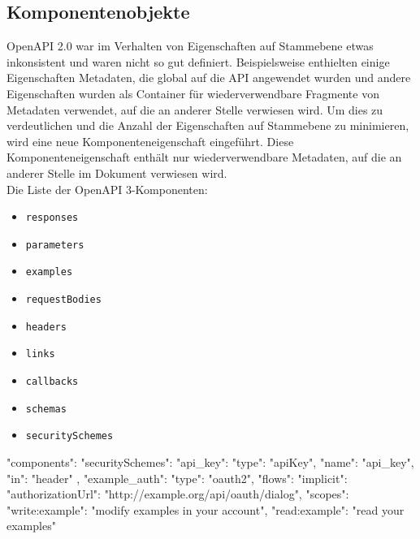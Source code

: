 \subsection{Komponentenobjekte}

OpenAPI 2.0 war im Verhalten von Eigenschaften auf Stammebene etwas inkonsistent und waren nicht so gut definiert. Beispielsweise enthielten einige Eigenschaften Metadaten, die global auf die API angewendet wurden und andere Eigenschaften wurden als Container für wiederverwendbare Fragmente von Metadaten verwendet, auf die an anderer Stelle verwiesen wird. Um dies zu verdeutlichen und die Anzahl der Eigenschaften auf Stammebene zu minimieren, wird eine neue Komponenteneigenschaft eingeführt. Diese Komponenteneigenschaft enthält nur wiederverwendbare Metadaten, auf die an anderer Stelle im Dokument verwiesen wird.\\

Die Liste der OpenAPI 3-Komponenten:

\begin{itemize}
	\item \texttt{responses}
	\item \texttt{parameters}
	\item \texttt{examples}
	\item \texttt{requestBodies}
	\item \texttt{headers}
	\item \texttt{links}
	\item \texttt{callbacks}
	\item \texttt{schemas}
	\item \texttt{securitySchemes}
\end{itemize}

\begin{LaTeXCode}[caption={Komponenten: securitySchemes - Beispiel},captionpos=b, label=LaTeXCode:openapi3.0-1][numbers=none]
"components": {
	"securitySchemes": {
		"api_key": {
			"type": "apiKey",
			"name": "api_key",
			"in": "header"
		},
		"example_auth": {
			"type": "oauth2",
			"flows": {
				"implicit": {
					"authorizationUrl": "http://example.org/api/oauth/dialog",
					"scopes": {
						"write:example": "modify examples in your account",
						"read:example": "read your examples"
					}
				}
			}
		}
	}
}
\end{LaTeXCode}















































